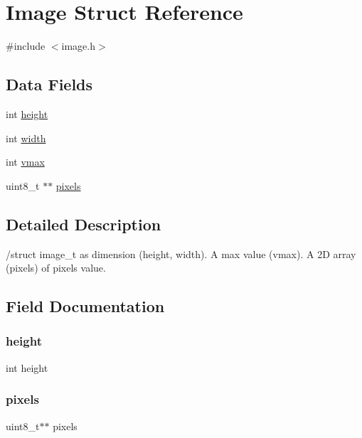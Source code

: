 \hypertarget{struct_image}{}\section{Image Struct Reference}
\label{struct_image}


{\ttfamily \#include $<$image.\+h$>$}

\subsection*{Data Fields}
\begin{DoxyCompactItemize}
\item 
int \mbox{\hyperlink{struct_image_ad12fc34ce789bce6c8a05d8a17138534}{height}}
\item 
int \mbox{\hyperlink{struct_image_a2474a5474cbff19523a51eb1de01cda4}{width}}
\item 
int \mbox{\hyperlink{struct_image_aeb4eb9ad2dc148d828a7f6e270aa0f09}{vmax}}
\item 
uint8\+\_\+t $\ast$$\ast$ \mbox{\hyperlink{struct_image_af6645b977fde09dc1c18676bcc783673}{pixels}}
\end{DoxyCompactItemize}


\subsection{Detailed Description}
/struct image\+\_\+t as dimension (height, width). A max value (vmax). A 2D array (pixels) of pixels value. 

\subsection{Field Documentation}
\mbox{\label{struct_image_ad12fc34ce789bce6c8a05d8a17138534}} 
\subsubsection{\texorpdfstring{height}{height}}
{\footnotesize\ttfamily int height}

\mbox{\label{struct_image_af6645b977fde09dc1c18676bcc783673}} 
\subsubsection{\texorpdfstring{pixels}{pixels}}
{\footnotesize\ttfamily uint8\+\_\+t$\ast$$\ast$ pixels}

